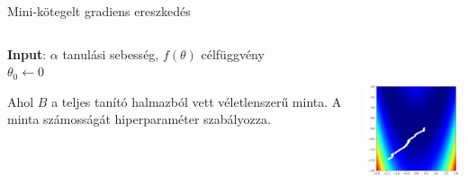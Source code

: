 \documentclass[english, aspectratio=169]{beamer}
\begin{document}
\begin{frame}{Mini-kötegelt gradiens ereszkedés}
	\begin{columns}
		\begin{column}{.7\textwidth}
			\begin{algorithm}[H]
				\caption{Mini-kötegelt gradiens ereszkedés}
				\SetAlgoLined
				\textbf{Input}: $\alpha$ tanulási sebesség, $f(\theta)$ célfüggvény\\
				$\theta_0 \leftarrow 0$ 
			\end{algorithm}
			Ahol $B$ a teljes tanító halmazból vett véletlenszerű minta. A minta számosságát hiperparaméter szabályozza. 
		\end{column}
		\begin{column}{.3\textwidth}
			\begin{center}
				\includegraphics[height=5cm, width=5cm, keepaspectratio]{images/gd_minibatch.png}
			\end{center}
		\end{column}
	\end{columns}
\end{frame}
\end{document}
